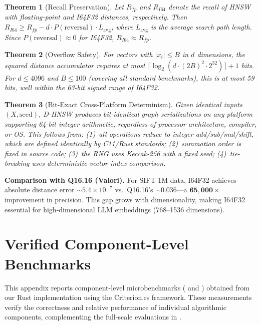 \documentclass[10pt,journal]{IEEEtran}
\newtheorem{theorem}{Theorem}
\newcommand{\dhnsw}{\textsc{D-HNSW}}
\newcommand{\hnsw}{\textsc{HNSW}}
\begin{document}
\begin{theorem}[Recall Preservation]
\label{thm:recall_pres}
Let $R_{fp}$ and $R_{I64}$ denote the recall of \hnsw{} with floating-point and I64F32 distances, respectively. Then $R_{I64} \geq R_{fp} - d \cdot P(\text{reversal}) \cdot L_{\text{avg}}$, where $L_{\text{avg}}$ is the average search path length. Since $P(\text{reversal}) \approx 0$ for I64F32, $R_{I64} \approx R_{fp}$.
\end{theorem}

\begin{theorem}[Overflow Safety]
\label{thm:overflow}
For vectors with $|x_i| \leq B$ in $d$ dimensions, the squared distance accumulator requires at most $\lceil\log_2(d \cdot (2B)^2 \cdot 2^{32})\rceil + 1$ bits. For $d \leq 4096$ and $B \leq 100$ (covering all standard benchmarks), this is at most 59 bits, well within the 63-bit signed range of I64F32.
\end{theorem}

\begin{theorem}[Bit-Exact Cross-Platform Determinism]
\label{thm:crossplatform}
Given identical inputs $(X, \text{seed})$, \dhnsw{} produces bit-identical graph serializations on any platform supporting 64-bit integer arithmetic, regardless of processor architecture, compiler, or OS. This follows from: (1)~all operations reduce to integer add/sub/mul/shift, which are defined identically by C11/Rust standards; (2)~summation order is fixed in source code; (3)~the RNG uses Keccak-256 with a fixed seed; (4)~tie-breaking uses deterministic vector-index comparison.
\end{theorem}

\textbf{Comparison with Q16.16 (Valori).} For SIFT-1M data, I64F32 achieves absolute distance error $\sim 5.4 \times 10^{-7}$ vs.\ Q16.16's $\sim 0.036$---a $\mathbf{65{,}000\times}$ improvement in precision. This gap grows with dimensionality, making I64F32 essential for high-dimensional LLM embeddings (768--1536 dimensions).


\section{Verified Component-Level Benchmarks}
\label{sec:appendix_benchmarks}

This appendix reports component-level microbenchmarks ( and ) obtained from our Rust implementation using the Criterion.rs framework. These measurements verify the correctness and relative performance of individual algorithmic components, complementing the full-scale evaluations in .
\end{document}

